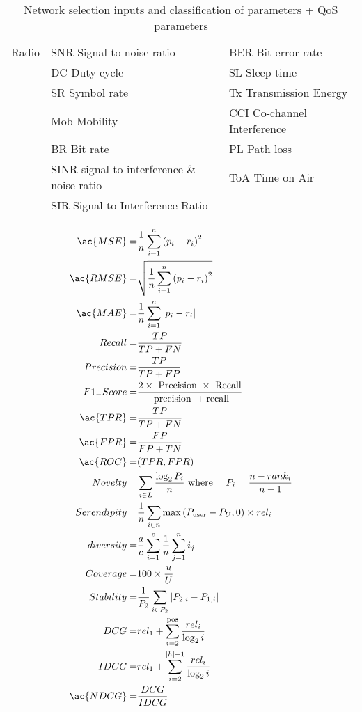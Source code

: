 \begin{table}[h]
\begin{tabular}{l|l|l}
	Radio 				       			& \ac{SNR} Signal-to-noise ratio						  &	\ac{BER} Bit error rate							\\
	\							        & \ac{DC} Duty cycle                            		  & \ac{SL} Sleep time              		        \\
	\							        & \ac{SR} Symbol rate									  &	\ac{Tx} Transmission Energy   					\\
	\							        & \ac{Mob} Mobility										  & \ac{CCI} Co-channel Interference				\\
	\							        & \ac{BR} Bit rate								  		  &	\ac{PL} Path loss								\\
	\									& \ac{SINR} signal-to-interference \& noise ratio 	 	  & \ac{ToA}  Time on Air							\\
	\									& \ac{SIR} Signal-to-Interference Ratio 				  & 												\\
	\end{tabular}
\caption{\label{tab:scheduling} Network selection inputs and classification of parameters \cite{bendaoud_network_2019} + QoS parameters \cite{meshinchi_qosaware_2018} \cite{chowdhury_survey_2018}}
\end{table}

\begin{align}
\ac{MSE}=         & \frac{1}{n} \sum_{i=1}^{n}\left(p_{i}-r_{i}\right)^{2} \\
\ac{RMSE}=        & \sqrt{\frac{1}{n} \sum_{i=1}^{n}\left(p_{i}-r_{i}\right)^{2}} \\
\ac{MAE}=         & \frac{1}{n} \sum_{i=1}^{n}\left|p_{i}-r_{i}\right| \\
Recall=      & \frac{T P}{T P+F N} \\
Precision=   & \frac{T P}{T P+F P} \\
F1_{-}Score= & \frac{2 \times \text { Precision } \times \text { Recall}}{\text { precision }+\text {recall}} \\
\ac{TPR} =        & \frac{T P}{T P+F N} \\
\ac{FPR} =        & \frac{F P}{F P+T N} \\
\ac{ROC}=& (TPR,FPR)\\
Novelty=     & \sum_{i \in L} \frac{\log _{2} P_{i}}{n} \text { where } \quad P_{i}=\frac{n-r a n k_{i}}{n-1} \\
Serendipity= & \frac{1}{n} \sum_{i \in n} \max \left(P_{\text {user}}-P_{U}, 0\right) \times r e l_{i} \\
diversity=   & \frac{a}{c} \sum_{i=1}^{c} \frac{1}{n} \sum_{j=1}^{n} i_{j} \\
Coverage=    & 100 \times \frac{u}{U} \\
Stability=   & \frac{1}{P_{2}} \sum_{i \in P_{2}}\left|P_{2, i}-P_{1, i}\right| \\
DCG=         & r e l_{1}+\sum_{i=2}^{\text {pos}} \frac{r e l_{i}}{\log _{2} i} \\
IDCG=        & r e l_{1}+\sum_{i=2}^{|h|-1} \frac{r e l_{i}}{\log _{2} i} \\
\ac{NDCG}=        & \frac{D C G}{I D C G} \\
\end{align}


